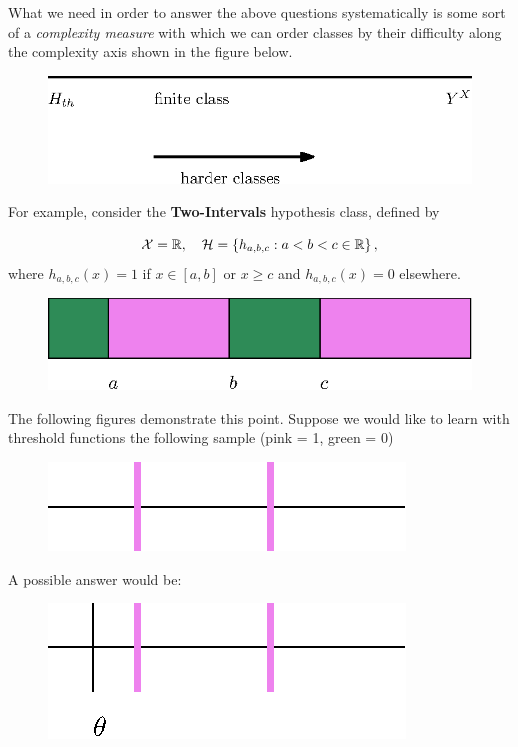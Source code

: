 \documentclass[11pt]{article}
\newcommand{\Hc}{\mathcal{H}}
\begin{document}
What we need in order to answer the above questions systematically is some sort of a \textit{complexity measure} with which we can order classes by their difficulty along the complexity axis shown in the figure below.

\begin{figure}[h!]
\centering
\includegraphics[scale=0.6]{complexity_measure.eps}
\end{figure}

For example, consider the \textbf{Two-Intervals} hypothesis class, defined by

\[\X = \reals, \quad \Hc = \{ h_{a,b,c} : a < b < c \in \reals\}\,,\]
 where $h_{a,b,c}(x)=1$ if $x \in [a,b]$ or $x\geq c$ and $h_{a,b,c}(x)=0$ elsewhere.

\begin{figure}[h!]
\centering
\includegraphics[scale=0.8]{2_intervals.eps}
\end{figure}



The following figures demonstrate this point. Suppose we would like to learn with threshold functions the following sample  (pink = 1, green = 0)
\begin{figure}[h!]
\centering
\includegraphics[scale=0.6]{VC_threshold_intuitive.eps}
\end{figure}

A possible answer would be:
\begin{figure}[h!]
\centering
\includegraphics[scale=0.6]{VC_threshold_intuitive3.eps}
\end{figure}
\end{document}
